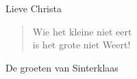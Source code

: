 \documentclass[12pt]{brief}
\date{12 augustus 2006}
\begin{document}
\begin{letter}{Lieve Christa}

\opening{}


\begin{verse}

Wie het kleine niet eert\\
is het grote niet Weert!\\[1.5em]

\end{verse}


De groeten van Sinterklaas


\closing{}

\end{letter}
\end{document}
